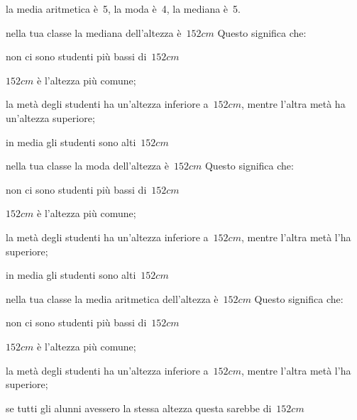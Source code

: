 \begin{esercizio}
\begin{enumerate*}
\begin{enumeratea}
\item la media aritmetica è~5, la moda è~4, la mediana è~5.
 \end{enumeratea}
\item nella tua classe la mediana dell'altezza è~$152\unit{cm}$ Questo 
significa che:
 \begin{enumeratea}
\item non ci sono studenti più bassi di~$152\unit{cm}$
\item $152\unit{cm}$ è l'altezza più comune;
\item la metà degli studenti ha un'altezza inferiore a~$152\unit{cm}$, 
mentre l'altra metà ha un'altezza superiore;
\item in media gli studenti sono alti~$152\unit{cm}$
 \end{enumeratea}
\item nella tua classe la moda dell'altezza è~$152\unit{cm}$ Questo 
significa che:
 \begin{enumeratea}
\item non ci sono studenti più bassi di~$152\unit{cm}$
\item $152\unit{cm}$ è l'altezza più comune;
\item la metà degli studenti ha un'altezza inferiore a~$152\unit{cm}$, 
mentre l'altra metà l'ha superiore;
\item in media gli studenti sono alti~$152\unit{cm}$
 \end{enumeratea}
\item nella tua classe la media aritmetica dell'altezza è~$152\unit{cm}$ 
Questo significa che:
 \begin{enumeratea}
\item non ci sono studenti più bassi di~$152\unit{cm}$
\item $152\unit{cm}$ è l'altezza più comune;
\item la metà degli studenti ha un'altezza inferiore a~$152\unit{cm}$, 
mentre l'altra metà l'ha superiore;
\item se tutti gli alunni avessero la stessa altezza questa sarebbe 
di~$152\unit{cm}$
 \end{enumeratea}
\end{enumerate*}
\end{esercizio}

